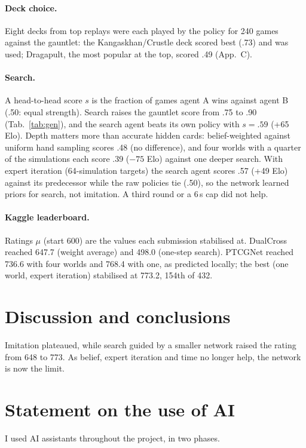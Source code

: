 \documentclass{article}
\begin{document}
\paragraph*{Deck choice.} Eight decks from top replays were each played by the policy for 240 games against the gauntlet: the Kangaskhan/Crustle deck scored best (.73) and was used; Dragapult, the most popular at the top, scored .49 (App.~C).

\paragraph*{Search.} A head-to-head score $s$ is the fraction of games agent A wins against agent B (.50: equal strength). Search raises the gauntlet score from .75 to .90 (Tab.~\ref{tab:gen}), and the search agent beats its own policy with $s{=}.59$ (+65 Elo). Depth matters more than accurate hidden cards: belief-weighted against uniform hand sampling scores .48 (no difference), and four worlds with a quarter of the simulations each score .39 ($-75$ Elo) against one deeper search. With expert iteration (64-simulation targets) the search agent scores .57 (+49 Elo) against its predecessor while the raw policies tie (.50), so the network learned priors for search, not imitation. A third round or a 6\,s cap did not help.

\paragraph*{Kaggle leaderboard.} Ratings $\mu$ \cite{herbrich2006trueskill} (start 600) are the values each submission stabilised at. DualCross reached 647.7 (weight average) and 498.0 (one-step search). PTCGNet reached 736.6 with four worlds and 768.4 with one, as predicted locally; the best (one world, expert iteration) stabilised at 773.2, 154th of 432.

\section{Discussion and conclusions}
Imitation plateaued, while search guided by a smaller network raised the rating from 648 to 773. As belief, expert iteration and time no longer help, the network is now the limit.

\section{Statement on the use of AI}\label{sec:ai}
I used AI assistants throughout the project, in two phases.
\end{document}
